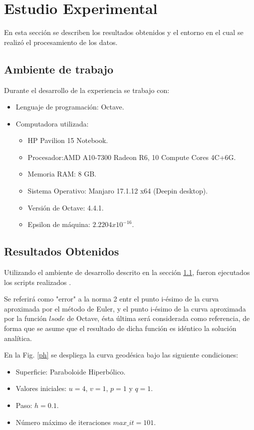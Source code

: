 \documentclass{endm}
\begin{document}
\section{Estudio Experimental}\label{Resultados}
En esta secci\'on se describen los resultados obtenidos y el entorno en el cual se realiz\'o el procesamiento de los datos.
\subsection{Ambiente de trabajo}\label{ambiente}
Durante el desarrollo de la experiencia se trabajo con:
\begin{itemize}
    \item Lenguaje de programaci\'on: Octave.
    \item Computadora utilizada:
    \begin{itemize}
        \item HP Pavilion 15 Notebook.
        \item Procesador:AMD A10-7300 Radeon R6, 10 Compute Cores 4C+6G.
        \item Memoria RAM: 8 GB.
        \item Sistema Operativo: Manjaro 17.1.12 x64 (Deepin desktop).
        \item Versi\'on de Octave: 4.4.1.
        \item Epsilon de m\'aquina: $2.2204x10^{-16}$.
    \end{itemize}
\end{itemize}


\subsection{Resultados Obtenidos}

Utilizando el ambiente de desarrollo descrito en la secci\'on \ref{ambiente}, fueron ejecutados los scripts realizados \cite{scripts}.

Se referir\'a como "error" a la norma 2 entr el punto i-\'esimo de la curva aproximada por el m\'etodo de Euler, y el punto i-\'esimo de la curva aproximada por la funci\'on $lsode$ de Octave, \'esta \'ultima ser\'a considerada como referencia, de forma que se asume que el resultado de dicha funci\'on es id\'entico la soluci\'on anal\'itica.

En la Fig. \ref{ph} se despliega la curva geod\'esica bajo las siguiente condiciones:
\begin{itemize}
    \item Superficie: Paraboloide Hiperb\'olico.
    \item Valores iniciales: $u=4$, $v=1$, $p=1$ y $q=1$.
    \item Paso: $h=0.1$.
    \item N\'umero m\'aximo de iteraciones $max\_it=101$.
\end{itemize}
\end{document}
